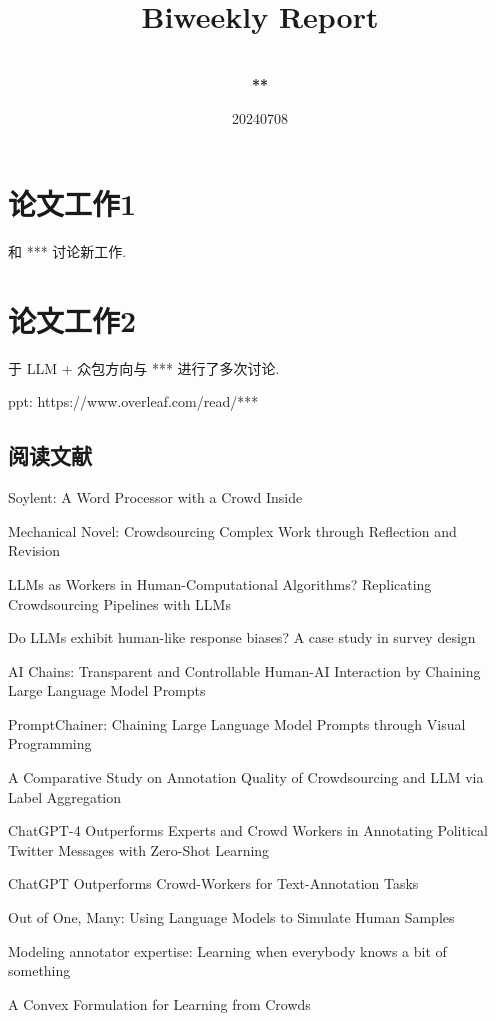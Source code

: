 \documentclass[a4paper]{article}
\title{
    \vspace*{1.0in}
     \\
    \vspace*{1in}
    \textbf{\Huge Biweekly Report}
    \vspace{0.5in}
}
\author{ \\
    \textbf{\huge ***} \\
    \vspace*{1in}
}
\date{\LARGE 20240708}
\begin{document}
\LARGE

\maketitle
\tableofcontents
\thispagestyle{empty}
\newpage

\section{论文工作1}

和 *** 讨论新工作.

\section{论文工作2}

于 LLM + 众包方向与 *** 进行了多次讨论.

ppt: https://www.overleaf.com/read/***

\subsection{阅读文献}

Soylent: A Word Processor with a Crowd Inside

Mechanical Novel: Crowdsourcing Complex Work through Reflection and Revision

LLMs as Workers in Human-Computational Algorithms? Replicating Crowdsourcing Pipelines with LLMs

Do LLMs exhibit human-like response biases? A case study in survey design

AI Chains: Transparent and Controllable Human-AI Interaction by Chaining Large Language Model Prompts

PromptChainer: Chaining Large Language Model Prompts through Visual Programming

A Comparative Study on Annotation Quality of Crowdsourcing and LLM via Label Aggregation

ChatGPT-4 Outperforms Experts and Crowd Workers in Annotating Political Twitter Messages with Zero-Shot Learning

ChatGPT Outperforms Crowd-Workers for Text-Annotation Tasks

Out of One, Many: Using Language Models to Simulate Human Samples

Modeling annotator expertise: Learning when everybody knows a bit of something

A Convex Formulation for Learning from Crowds
\end{document}

